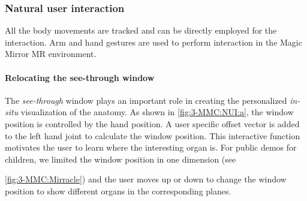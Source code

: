{{\subsubsection{Natural user interaction}
All the body movements are tracked and can be directly employed for the interaction. Arm and hand gestures are used to perform interaction in the Magic Mirror MR environment.

\paragraph{Relocating the see-through window}
The \textit{see-through} window plays an important role in creating the personalized \textit{in-situ} visualization of the anatomy.
As shown in \figurename{\ref{fig:3-MMC:NUI:a}}, the window position is controlled by the hand position. A user specific offset vector is added to the left hand joint to calculate the window position. This interactive function motivates the user to learn where the interesting organ is. For public demos for children, we limited the window position in one dimension (see \figurename{\ref{fig:3-MMC:Mirracle}) and the user moves up or down to change the window position to show different organs in the corresponding planes.
	
}}}
